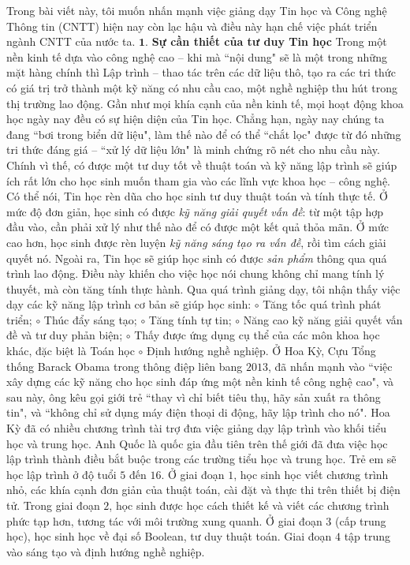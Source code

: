 \begin{multicols}{2}
	Trong bài viết này, tôi muốn nhấn mạnh việc giảng dạy Tin học và Công nghệ Thông tin (CNTT) hiện nay còn lạc hậu và điều này hạn chế việc phát triển ngành CNTT của nước ta.  
	\vskip 0.05cm
	$\pmb{1.}$ \textbf{\color{diendantoanhoc}Sự cần thiết của tư duy Tin học}
	\vskip 0.05cm
	Trong một nền kinh tế dựa vào công nghệ cao -- khi mà ``nội dung" sẽ là một trong những mặt hàng chính thì Lập trình -- thao tác trên các dữ liệu thô, tạo ra các tri thức có giá trị trở thành một kỹ năng có nhu cầu cao, một nghề nghiệp thu hút trong thị trường lao động. Gần như mọi khía cạnh của nền kinh tế, mọi hoạt động khoa học ngày nay đều có sự hiện diện của Tin học. Chẳng hạn, ngày nay chúng ta đang ``bơi trong biển dữ liệu", làm thế nào để có thể ``chắt lọc" được từ đó những tri thức đáng giá -- ``xử lý dữ liệu lớn" là minh chứng rõ nét cho nhu cầu này.
	\vskip 0.05cm
	Chính vì thế, có được một tư duy tốt về thuật toán và kỹ năng lập trình sẽ giúp ích rất lớn cho học sinh muốn tham gia vào các lĩnh vực khoa học -- công nghệ.
	\vskip 0.05cm
	Có thể nói, Tin học rèn dũa cho học sinh tư duy thuật toán và tính thực tế. Ở mức độ đơn giản, học sinh có được \textit{kỹ năng giải quyết vấn đề}: từ một tập hợp đầu vào, cần phải xử lý như thế nào để có được một kết quả thỏa mãn. Ở mức cao hơn, học sinh được rèn luyện \textit{kỹ năng sáng tạo ra vấn đề}, rồi tìm cách giải quyết nó. Ngoài ra, Tin học sẽ giúp học sinh có được \textit{sản phẩm} thông qua quá trình lao động. Điều này khiến cho việc học nói chung không chỉ mang tính lý thuyết, mà còn tăng tính thực hành.
	\vskip 0.05cm
	Qua quá trình giảng dạy, tôi nhận thấy việc dạy các kỹ năng lập trình cơ bản sẽ giúp học sinh:
	\vskip 0.05cm
	$\circ$	Tăng tốc quá trình phát triển;
	\vskip 0.05cm
	$\circ$	Thúc đẩy sáng tạo;
	\vskip 0.05cm
	$\circ$	Tăng tính tự tin;
	\vskip 0.05cm
	$\circ$	Năng cao kỹ năng giải quyết vấn đề và tư duy phản biện;
	\vskip 0.05cm
	$\circ$	Thấy được ứng dụng cụ thể của các môn khoa học khác, đặc biệt là Toán học
	\vskip 0.05cm
	$\circ$	Định hướng nghề nghiệp.
	\vskip 0.05cm
	Ở Hoa Kỳ, Cựu Tổng thống Barack Obama trong thông điệp liên bang $2013$, đã nhấn mạnh vào ``việc xây dựng các kỹ năng cho học sinh đáp ứng một nền kinh tế công nghệ cao", và sau này, ông kêu gọi giới trẻ ``thay vì chỉ biết tiêu thụ, hãy sản xuất ra thông tin", và ``không chỉ sử dụng máy điện thoại di động, hãy lập trình cho nó". Hoa Kỳ đã có nhiều chương trình tài trợ đưa việc giảng dạy lập trình vào khối tiểu học và trung học.
	\vskip 0.05cm
	Anh Quốc là quốc gia đầu tiên trên thế giới đã đưa việc học lập trình thành điều bắt buộc trong các trường tiểu học và trung học. Trẻ em sẽ học lập trình ở độ tuổi $5$ đến $16$. Ở giai đoạn $1$, học sinh học viết chương trình nhỏ, các khía cạnh đơn giản của thuật toán, cài đặt và thực thi trên thiết bị điện tử. Trong giai đoạn $2$, học sinh được học cách thiết kế và viết các chương trình phức tạp hơn, tương tác với môi trường xung quanh. Ở giai đoạn $3$ (cấp trung học), học sinh học về đại số Boolean, tư duy thuật toán. Giai đoạn $4$ tập trung vào sáng tạo và định hướng nghề nghiệp.

\end{multicols}

